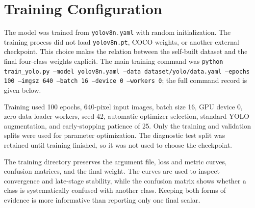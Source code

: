\documentclass[11pt,conference,a4paper]{IEEEtran}
\newcommand{\code}[1]{\texttt{\footnotesize #1}}
\begin{document}
\section{Training Configuration}
The model was trained from \code{yolov8n.yaml} with random initialization. The training process did not load \code{yolov8n.pt}, COCO weights, or another external checkpoint. This choice makes the relation between the self-built dataset and the final four-class weights explicit. The main training command was \code{python train\_yolo.py --model yolov8n.yaml --data dataset/yolo/data.yaml --epochs 100 --imgsz 640 --batch 16 --device 0 --workers 0}; the full command record is given below.

Training used 100 epochs, 640-pixel input images, batch size 16, GPU device 0, zero data-loader workers, seed 42, automatic optimizer selection, standard YOLO augmentation, and early-stopping patience of 25. Only the training and validation splits were used for parameter optimization. The diagnostic test split was retained until training finished, so it was not used to choose the checkpoint.

The training directory preserves the argument file, loss and metric curves, confusion matrices, and the final weight. The curves are used to inspect convergence and late-stage stability, while the confusion matrix shows whether a class is systematically confused with another class. Keeping both forms of evidence is more informative than reporting only one final scalar.
\end{document}
